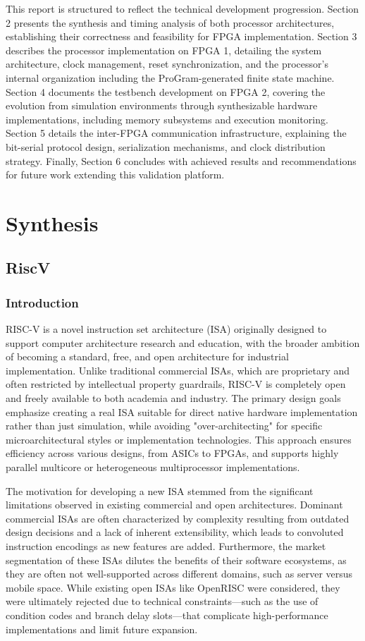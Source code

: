 \documentclass[12pt]{article}
\begin{document}
This report is structured to reflect the technical development progression. Section 2 presents the synthesis and timing analysis of both processor architectures, establishing their correctness and feasibility for FPGA implementation. Section 3 describes the processor implementation on FPGA 1, detailing the system architecture, clock management, reset synchronization, and the processor's internal organization including the ProGram-generated finite state machine. Section 4 documents the testbench development on FPGA 2, covering the evolution from simulation environments through synthesizable hardware implementations, including memory subsystems and execution monitoring. Section 5 details the inter-FPGA communication infrastructure, explaining the bit-serial protocol design, serialization mechanisms, and clock distribution strategy. Finally, Section 6 concludes with achieved results and recommendations for future work extending this validation platform.
\newpage
\FloatBarrier
\section{Synthesis}

\subsection{RiscV}
\subsubsection{Introduction}
RISC-V is a novel instruction set architecture (ISA) originally designed to support computer architecture research and education, with the broader ambition of becoming a standard, free, and open architecture for industrial implementation. Unlike traditional commercial ISAs, which are proprietary and often restricted by intellectual property guardrails, RISC-V is completely open and freely available to both academia and industry. The primary design goals emphasize creating a real ISA suitable for direct native hardware implementation rather than just simulation, while avoiding "over-architecting" for specific microarchitectural styles or implementation technologies. This approach ensures efficiency across various designs, from ASICs to FPGAs, and supports highly parallel multicore or heterogeneous multiprocessor implementations.

The motivation for developing a new ISA stemmed from the significant limitations observed in existing commercial and open architectures. Dominant commercial ISAs are often characterized by complexity resulting from outdated design decisions and a lack of inherent extensibility, which leads to convoluted instruction encodings as new features are added. Furthermore, the market segmentation of these ISAs dilutes the benefits of their software ecosystems, as they are often not well-supported across different domains, such as server versus mobile space. While existing open ISAs like OpenRISC were considered, they were ultimately rejected due to technical constraints—such as the use of condition codes and branch delay slots—that complicate high-performance implementations and limit future expansion.
\end{document}
